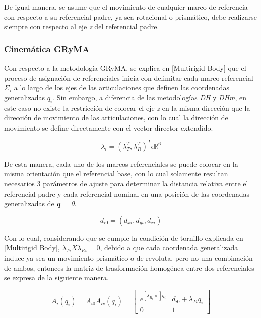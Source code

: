         De igual manera, se asume que el movimiento de cualquier marco de referencia con respecto 
        a su referencial padre, ya sea rotacional o prismático, debe realizarse siempre con respecto 
        al eje \emph{z} del referencial padre.

    \subsubsection{Cinemática GRyMA}
        Con respecto a la metodología GRyMA, se explica en [Multirigid Body] que el proceso de asignación 
        de referenciales inicia con delimitar cada marco referencial $\Sigma_i$ a lo largo de los ejes 
        de las articulaciones que definen las coordenadas generalizadas $q_i$. Sin embargo, a 
        diferencia de las metodologías \emph{DH} y \emph{DHm}, en este caso no existe la 
        restricción de colocar el eje \emph{z} en la misma dirección que la dirección de movimiento de las 
        articulaciones, con lo cual la dirección de movimiento se define directamente con el 
        vector director extendido.

        \begin{equation*}
            \lambda_i = (\lambda^T_T, \lambda^T_R)^T \epsilon \mathbb{R}^6
        \end{equation*}

        De esta manera, cada uno de los marcos referenciales se puede colocar en la misma 
        orientación que el referencial base, con lo cual solamente resultan necesarios 3 
        parámetros de ajuste para determinar la distancia relativa entre el referencial 
        padre y cada referencial nominal en una posición de las coordenadas generalizadas de 
        \emph{\textbf{q} = 0}.

        \begin{equation*}
            d_{i0} = (d_{xi}, d_{yi}, d_{xi})
        \end{equation*}

        Con lo cual, considerando que se cumple la condición de tornillo explicada en [Multirigid Body], 
        $\lambda_{Ti} X \lambda_{Ri} = 0$, debido a que cada coordenada generalizada 
        induce ya sea un movimiento prismático o de revoluta, pero no una combinación de ambos, 
        entonces la matriz de trasformación homogénea entre dos referenciales se 
        expresa de la siguiente manera.
        
        \begin{equation}
            A_i(q_i) = A_{i0} A_{iv}(q_i) = 
            \begin{bmatrix}
                e^{[\lambda_{R_i}\times]q_i} & d_{i0} + \lambda_{Ti}q_i\\
                0 & 1
            \end{bmatrix}
            \label{eq:TH_GRYMA}
        \end{equation}

